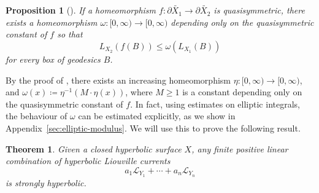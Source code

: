 \documentclass[12pt]{amsart}
\numberwithin{equation}{section}
\numberwithin{figure}{section}
\newtheorem{theorem}[equation]{Theorem}
\newtheorem{proposition}[equation]{Proposition}
\theoremstyle{definition}
\theoremstyle{plain}
\newcommand*{\wt}[1]{\widetilde{#1}}
\begin{document}
\begin{proposition}[{\cite[Proposition~15]{BS21:Infinite}}]
If a homeomorphism $f \colon \partial \wt{X_1} \to \partial \wt{X_2}$ is quasisymmetric, there exists a homeomorphism $\omega \colon [0, \infty) \to [0, \infty)$ depending only on the quasisymmetric constant of $f$ so that
\[
L_{X_2}(f(B)) \leq \omega(L_{X_1}(B))
\]
for every box of geodesics $B$.
\label{prop:ineq}
\end{proposition}

By the proof of \cite[Proposition~15]{BS21:Infinite}, there exists an increasing homeomorphism $\eta \colon [0,\infty) \to [0, \infty)$, and $\omega(x) \coloneqq \eta^{-1}(M\cdot \eta(x))$, where $M\geq 1$ is a constant depending only on the quasisymmetric constant of $f$.
In fact, using estimates on elliptic integrals, the behaviour of $\omega$ can be estimated explicitly, as we show in Appendix~\ref{sec:elliptic-modulus}. We will use this to prove the following result.

\begin{theorem}
Given a closed hyperbolic surface $X$, any finite positive linear combination of hyperbolic Liouville currents
\[
a_1 \mathcal{L}_{Y_1} + \cdots + a_n \mathcal{L}_{Y_n}
\]
is strongly hyperbolic.
\label{thm:comb_liouville}
\end{theorem}
\end{document}
